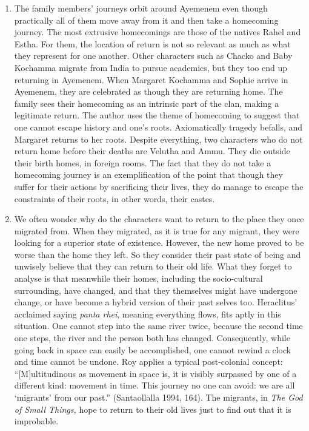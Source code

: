\begin{enumerate}
  \item The family members’ journeys orbit around Ayemenem even though practically all of them move away from it and then take a homecoming journey. The most extrusive homecomings are those of the natives Rahel and Estha. For them, the location of return is not so relevant as much as what they represent for one another. Other characters such as Chacko and Baby Kochamma migrate from India to pursue academics, but they too end up returning in Ayemenem. When Margaret Kochamma and Sophie arrive in Ayemenem, they are celebrated as though they are returning home. The family sees their homecoming as an intrinsic part of the clan, making a legitimate return. The author uses the theme of homecoming to suggest that one cannot escape history and one’s roots. Axiomatically tragedy befalls, and Margaret returns to her roots. Despite everything, two characters who do not return home before their deaths are Velutha and Ammu. They die outside their birth homes, in foreign rooms. The fact that they do not take a homecoming journey is an exemplification of the point that though they suffer for their actions by sacrificing their lives, they do manage to escape the constraints of their roots, in other words, their castes. 

  \item We often wonder why do the characters want to return to the place they once migrated from. When they migrated, as it is true for any migrant, they were looking for a superior state of existence. However, the new home proved to be worse than the home they left. So they consider their past state of being and unwisely believe that they can return to their old life. What they forget to analyse is that meanwhile their homes, including the socio-cultural surrounding, have changed, and that they themselves might have undergone change, or have become a hybrid version of their past selves too. Heraclitus’ acclaimed saying \emph{panta rhei}, meaning everything flows, fits aptly in this situation. One cannot step into the same river twice, because the second time one steps, the river and the person both has changed. Consequently, while going back in space can easily be accomplished, one cannot rewind a clock and time cannot be undone. Roy applies a typical post-colonial concept: “[M]ultitudinous as movement in space is, it is visibly surpassed by one of a different kind: movement in time. This journey no one can avoid: we are all ‘migrants’ from our past.” (Santaollalla 1994, 164). The migrants,  in \emph{The God of Small Things,} hope to return to their old lives just to find out that it is improbable.


\end{enumerate}
